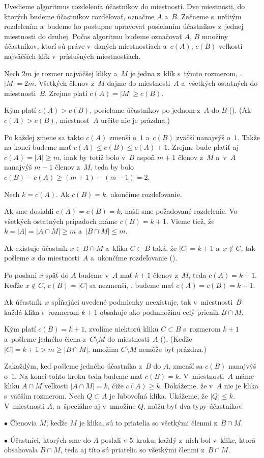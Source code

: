 {%
Uvedieme algoritmus rozdelenia účastníkov do miestností. Dve miestnosti, do ktorých budeme účastníkov rozdeľovať, označme $A$ a~$B$. Začneme s~určitým rozdelením a~budeme ho postupne upravovať posielaním účastníkov z~jednej miestnosti do druhej. Počas algoritmu budeme označovať $A$, $B$ množiny účastníkov, ktorí sú práve v~daných miestnostiach a~$c(A)$, $c(B)$ veľkosti najväčších klík v~príslušných miestnostiach.

Nech $2m$ je rozmer najväčšej kliky a~$M$ je jedna z~klík s~týmto rozmerom, \tj. $|M|=2m$. Všetkých členov z~$M$ dajme do miestnosti~$A$ a~všetkých ostatných do miestnosti~$B$. Zrejme platí $c(A)=|M|\ge c(B)$.

Kým platí $c(A)>c(B)$, posielame účastníkov po jednom z~$A$ do $B$ (\obr). (Ak $c(A)>c(B)$, miestnosť~$A$ určite nie je prázdna.)
%
 
Po každej zmene sa takto $c(A)$ zmenší o~$1$ a~$c(B)$ zväčší nanajvýš o~$1$. Takže na konci budeme mať $c(A)\le c(B)\le c(A)+1$. Zrejme bude platiť aj $c(A)=|A|\ge m$, inak by totiž bolo v~$B$ aspoň $m+1$ členov z~$M$ a~v~$A$ nanajvýš $m-1$ členov z~$M$, teda by bolo $c(B)-c(A)\ge(m+1)-(m-1)=2$.

Nech $k=c(A)$. Ak $c(B)=k$, ukončíme rozdeľovanie.

Ak sme dosiahli $c(A)=c(B)=k$, našli sme požadované rozdelenie. Vo všetkých ostatných prípadoch máme $c(B)=k+1$. Vieme tiež, že $k=|A|=|A\cap M|\ge m$ a~$|B\cap M|\le m$. 

Ak existuje účastník $x\in B\cap M$ a~klika $C\subset B$ taká, že $|C|=k+1$ a~$x\notin C$, tak pošleme $x$ do miestnosti~$A$ a~ukončíme rozdeľovanie (\obr).
%

Po poslaní $x$ späť do $A$ budeme v~$A$ mať $k+1$ členov z~$M$, teda $c(A)=k+1$. Keďže $x\notin C$, $c(B)=|C|$ sa nezmenší, \tj. budeme mať $c(A)=c(B)=k+1$.

Ak účastník~$x$ spĺňajúci uvedené podmienky neexistuje, tak v~miestnosti~$B$ každá klika s~rozmerom $k+1$ obsahuje ako podmnožinu celý prienik $B\cap M$.

Kým platí $c(B)=k+1$, zvolíme niektorú kliku $C\subset B$ s~rozmerom $k+1$ a~pošleme jedného člena z~$C\setminus M$ do miestnosti~$A$ (\obr). (Keďže $|C|=k+1>m\ge|B\cap M|$, množina $C\setminus M$ nemôže byť prázdna.) 
%

Zakaždým, keď pošleme jedného účastníka z~$B$ do $A$, zmenší sa $c(B)$ nanajvýš o~$1$. Na konci tohto kroku teda budeme mať $c(B)=k$. V~miestnosti~$A$ máme kliku $A\cap M$ veľkosti $|A\cap M|=k$, čiže $c(A)\ge k$. Dokážeme, že v~$A$ nie je klika s~väčším rozmerom. Nech $Q\subset A$ je ľubovoľná klika. Ukážeme, že $|Q|\le k$.
%
V~miestnosti $A$, a~špeciálne aj v~množine $Q$, môžu byť dva typy účastníkov:
\item{$\bullet$} Členovia $M$; keďže $M$ je klika, sú to priatelia so všetkými členmi z~$B\cap M$.
\item{$\bullet$} Účastníci, ktorých sme do $A$ poslali v 5.\,kroku; každý z~nich bol v~klike, ktorá obsahovala $B\cap M$, teda aj títo sú priatelia so všetkými členmi z~$B\cap M$.

}
